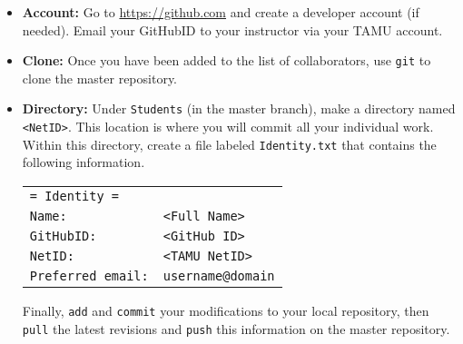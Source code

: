 \documentclass[11pt]{article}
\begin{document}
\begin{itemize}
\item \textbf{Account:} Go to \url{https://github.com} and create a developer account (if needed).
Email your GitHubID to your instructor via your TAMU account.
\item \textbf{Clone:} Once you have been added to the list of collaborators, use \texttt{git} to clone the master repository.
\item \textbf{Directory:} Under \texttt{Students} (in the master branch), make a directory named \texttt{<NetID>}.
This location is where you will commit all your individual work.
Within this directory, create a file labeled \texttt{Identity.txt} that contains the following information.
\begin{center}
\begin{tabular}{ll}
\texttt{= Identity =} \\
\texttt{Name:} & \texttt{<Full Name>} \\
\texttt{GitHubID:} & \texttt{<GitHub ID>} \\
\texttt{NetID:} & \texttt{<TAMU NetID>} \\
\texttt{Preferred email:} & \texttt{username@domain} \\
\end{tabular}
\end{center}
Finally, \texttt{add} and \texttt{commit} your modifications to your local repository, then \texttt{pull} the latest revisions and \texttt{push} this information on the master repository.
\end{itemize}
\end{document}
